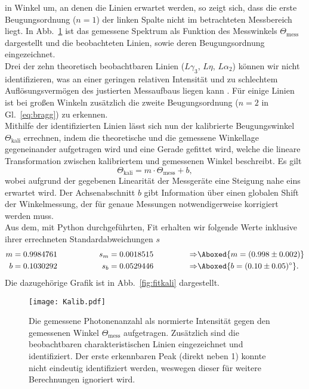 in Winkel um, an denen die Linien erwartet werden, so zeigt sich, dass die erste 
Beugungsordnung ($n=1$) der linken Spalte nicht im betrachteten Messbereich liegt. 
In Abb.~\ref{fig:kali} ist das gemessene Spektrum als Funktion des Messwinkels $\Theta_{\text{mess}}$
dargestellt und die beobachteten Linien, sowie deren Beugungsordnung eingezeichnet. \\
Drei der zehn theoretisch beobachtbaren Linien ($L\gamma_{3},\,L\eta,\,L\alpha_{2}$) 
können wir nicht identifizieren, was an einer 
geringen relativen Intensität und zu schlechtem Auflösungsvermögen des justierten Messaufbaus 
liegen kann \cite{xRay}. Für einige Linien ist bei großen Winkeln zusätzlich die zweite Beugungsordnung 
($n=2$ in Gl.~\eqref{eq:bragg}) zu erkennen. \\ 
Mithilfe der identifizierten Linien lässt sich nun der kalibrierte Beugungswinkel $\Theta_{\text{kali}}$ 
errechnen, indem die theoretische und die gemessene Winkellage gegeneinander aufgetragen wird und eine 
Gerade gefittet wird, welche die lineare Transformation zwischen kalibriertem und gemessenen Winkel beschreibt.
Es gilt
\begin{equation}
    \Theta_{\text{kali}} = m\cdot\Theta_{\text{mess}} + b,
\end{equation} 
wobei aufgrund der gegebenen Linearität der Messgeräte eine Steigung nahe eins erwartet wird. 
Der Achsenabschnitt $b$ gibt Information über einen globalen Shift der Winkelmessung, der für 
genaue Messungen notwendigerweise korrigiert werden muss. \\
Aus dem, mit Python durchgeführten, Fit erhalten wir folgende Werte inklusive ihrer errechneten 
Standardabweichungen $s$
\begin{alignat}{3}
    m &= 0.9984761 \hspace{1.5cm}&s_{m} = 0.0018515 \hspace{1.5cm} \Rightarrow&\Aboxed{m = (0.998\pm0.002)} \\
    b &= 0.1030292 \hspace{1.5cm}&s_{b} = 0.0529446 \hspace{1.5cm} \Rightarrow&\Aboxed{b = (0.10\pm0.05)^{\circ}}.
\end{alignat}   
Die dazugehörige Grafik ist in Abb.~\ref{fig:fitkali} dargestellt. \newpage
\begin{figure}[h!]
    \centering
    \texttt{[image: Kalib.pdf]}
    \caption{\label{fig:kali}Die gemessene Photonenanzahl als normierte Intensität gegen den 
    gemessenen Winkel $\Theta_{\text{mess}}$ aufgetragen. Zusätzlich sind die 
    beobachtbaren charakteristischen Linien eingezeichnet und identifiziert. 
    Der erste erkennbaren Peak (direkt neben 1) konnte nicht eindeutig identifiziert werden,
    weswegen dieser für weitere Berechnungen ignoriert wird.}
\end{figure}\FloatBarrier
